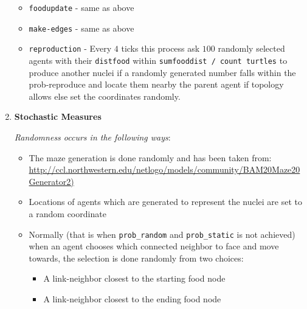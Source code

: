 \documentclass[a4paper, 11pt]{article}
\begin{document}
\begin{enumerate}
    \begin{itemize}
        \item \texttt{foodupdate} - same as above
        \item \texttt{make-edges} - same as above
        \item \texttt{reproduction} - Every $4$ ticks this process ask $100$ randomly selected agents with their \texttt{distfood} within \texttt{sumfooddist / count turtles} to produce another nuclei if a randomly generated number falls within the prob-reproduce and locate them nearby the parent agent if topology allows else set the coordinates randomly.
    \end{itemize}
    
    \item \textbf{Stochastic Measures} \par
    \textit{Randomness occurs in the following ways}:
    \begin{itemize}
        \item The maze generation is done randomly and has been taken from:\\ \url{http://ccl.northwestern.edu/netlogo/models/community/BAM20Maze20Generator2)}
        \item Locations of agents which are generated to represent the nuclei are set to a random coordinate
        \item Normally (that is when \texttt{prob\_random} and \texttt{prob\_static} is not achieved) when an agent chooses which connected neighbor to face and move towards, the selection is done randomly from two choices:
        \begin{itemize}
            \item A link-neighbor closest to the starting food node
            \item A link-neighbor closest to the ending food node
        \end{itemize}
        

\end{itemize}
\end{enumerate}
\end{document}
